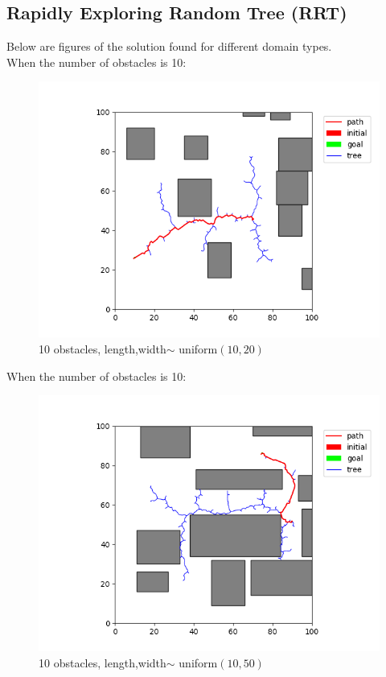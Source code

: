\documentclass[12pt,a4paper]{article}
\begin{document}
\subsection{Rapidly Exploring Random Tree (RRT)}

Below are figures of the solution found for different
domain types.\\

When the number of obstacles is 10:\\
\begin{figure}[H]
\centering

\includegraphics[scale=.40]{10_1.png}
\caption{10 obstacles, length,width$\sim$ uniform$(10,20)$}
\end{figure}

When the number of obstacles is 10:\\
\begin{figure}[H]
\centering

\includegraphics[scale=.40]{10_2.png}
\caption{10 obstacles, length,width$\sim$ uniform$(10,50)$}
\end{figure}
\end{document}

